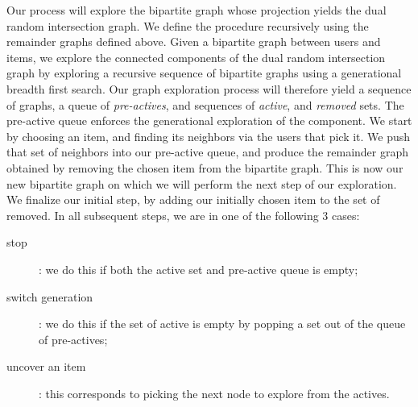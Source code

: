 Our process will explore the bipartite graph whose projection yields the dual random intersection graph.
We define the procedure recursively using the remainder graphs defined above.
Given a bipartite graph between users and items, we explore the connected components of the dual random intersection graph
by exploring a recursive sequence of bipartite graphs using a generational breadth first search.
Our graph exploration process will therefore yield a sequence of graphs, a queue of \emph{pre-actives}, and sequences of
\emph{active}, and \emph{removed} sets.
The pre-active queue enforces the generational exploration of the component.
We start by choosing an item, and finding its neighbors via the users that pick it.
We push that set of neighbors into our pre-active queue, and produce the remainder graph obtained by removing the chosen
item from the bipartite graph.
This is now our new bipartite graph on which we will perform the next step of our exploration.
We finalize our initial step, by adding our initially chosen item to the set of removed.
In all subsequent steps, we are in one of the following 3 cases:
\begin{description}
    \item[stop]: we do this if both the active set and pre-active queue is empty;
    \item[switch generation]: we do this if the set of active is empty by popping a set out of the queue of pre-actives;
    \item[uncover an item]: this corresponds to picking the next node to explore from the actives.
\end{description}
